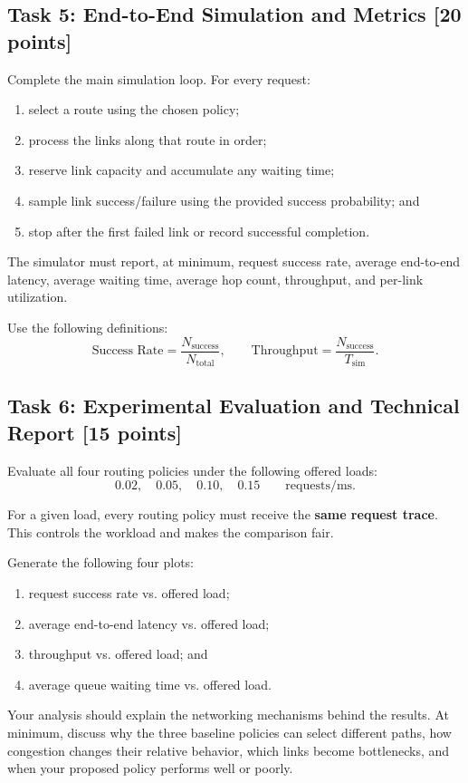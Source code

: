 \documentclass[11pt]{article}
\newcommand{\points}[1]{\hfill\textbf{[#1 points]}}
\begin{document}
\subsection{Task 5: End-to-End Simulation and Metrics \points{20}}
Complete the main simulation loop. For every request:
\begin{enumerate}
    \item select a route using the chosen policy;
    \item process the links along that route in order;
    \item reserve link capacity and accumulate any waiting time;
    \item sample link success/failure using the provided success probability; and
    \item stop after the first failed link or record successful completion.
\end{enumerate}

The simulator must report, at minimum, request success rate, average end-to-end latency, average waiting time, average hop count, throughput, and per-link utilization.

Use the following definitions:
\[
\text{Success Rate}=\frac{N_{\mathrm{success}}}{N_{\mathrm{total}}},
\qquad
\text{Throughput}=\frac{N_{\mathrm{success}}}{T_{\mathrm{sim}}}.
\]

\subsection{Task 6: Experimental Evaluation and Technical Report \points{15}}
Evaluate all four routing policies under the following offered loads:
\[
0.02,\quad 0.05,\quad 0.10,\quad 0.15 \qquad \text{requests/ms}.
\]

For a given load, every routing policy must receive the \textbf{same request trace}. This controls the workload and makes the comparison fair.

Generate the following four plots:
\begin{enumerate}
    \item request success rate vs. offered load;
    \item average end-to-end latency vs. offered load;
    \item throughput vs. offered load; and
    \item average queue waiting time vs. offered load.
\end{enumerate}

Your analysis should explain the networking mechanisms behind the results. At minimum, discuss why the three baseline policies can select different paths, how congestion changes their relative behavior, which links become bottlenecks, and when your proposed policy performs well or poorly.
\end{document}
